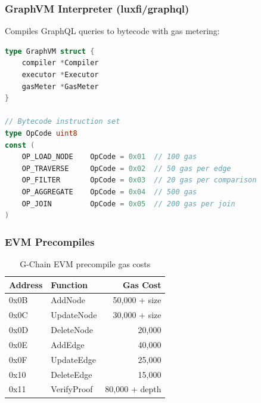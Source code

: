 \subsubsection{GraphVM Interpreter (luxfi/graphql)}

Compiles GraphQL queries to bytecode with gas metering:

\begin{lstlisting}[language=Go, basicstyle=\small\ttfamily]
type GraphVM struct {
    compiler *Compiler
    executor *Executor
    gasMeter *GasMeter
}

// Bytecode instruction set
type OpCode uint8
const (
    OP_LOAD_NODE    OpCode = 0x01  // 100 gas
    OP_TRAVERSE     OpCode = 0x02  // 50 gas per edge
    OP_FILTER       OpCode = 0x03  // 20 gas per comparison
    OP_AGGREGATE    OpCode = 0x04  // 500 gas
    OP_JOIN         OpCode = 0x05  // 200 gas per join
)
\end{lstlisting}

\subsubsection{EVM Precompiles}

\begin{table}[h]
\centering
\begin{tabular}{@{}llr@{}}
\toprule
\textbf{Address} & \textbf{Function} & \textbf{Gas Cost} \\ \midrule
0x0B & AddNode & 50,000 + size \\
0x0C & UpdateNode & 30,000 + size \\
0x0D & DeleteNode & 20,000 \\
0x0E & AddEdge & 40,000 \\
0x0F & UpdateEdge & 25,000 \\
0x10 & DeleteEdge & 15,000 \\
0x11 & VerifyProof & 80,000 + depth \\ \bottomrule
\end{tabular}
\caption{G-Chain EVM precompile gas costs}
\end{table}

